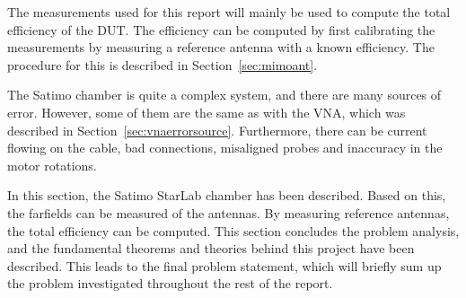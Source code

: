 The measurements used for this report will mainly be used to compute the total efficiency of the DUT.
The efficiency can be computed by first calibrating the measurements by measuring a reference antenna with a known efficiency. The procedure for this is described in Section~\ref{sec:mimoant}.

The Satimo chamber is quite a complex system, and there are many sources of error. However, some of them are the same as with the VNA, which was described in Section~\ref{sec:vnaerrorsource}. Furthermore, there can be current flowing on the cable, bad connections, misaligned probes and inaccuracy in the motor rotations. 

\begin{aautail}
In this section, the Satimo StarLab chamber has been described. Based on this, the farfields can be measured of the antennas. By measuring reference antennas, the total efficiency can be computed. 
This section concludes the problem analysis, and the fundamental theorems and theories behind this project have been described. This leads to the final problem statement, which will briefly sum up the problem investigated throughout the rest of the report.
\end{aautail}
